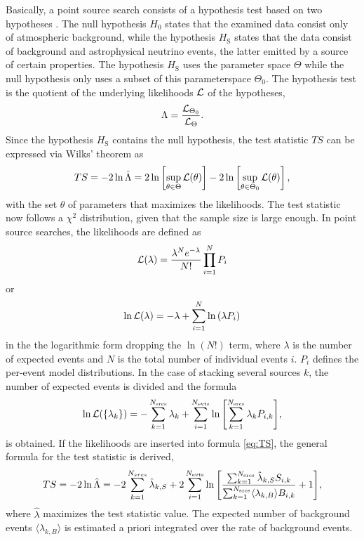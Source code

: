 Basically, a point source search consists of a hypothesis test based on two hypotheses \cite{likelihood_method}.
The null hypothesis $H_0$ states that the examined data consist only of atmospheric background, while the hypothesis $H_\text{S}$ states that the data consist of background and astrophysical neutrino events, the latter emitted by a source of certain properties.
The hypothesis $H_\text{S}$ uses the parameter space $\Theta$ while the null hypothesis only uses a subset of this parameterspace $\Theta_0$.
The hypothesis test is the quotient of the underlying likelihoods $\mathcal{L}$ of the hypotheses,
\begin{equation}
  \Lambda = \frac{\mathcal{L}_{\Theta_0}}{\mathcal{L}_\Theta}.
\end{equation}
Since the hypothesis $H_\text{S}$ contains the null hypothesis, the test statistic $TS$ can be expressed via Wilks' theorem \cite{wilk} as
\begin{equation}
  TS = -2\ln\hat{\Lambda} = 2\ln\left[ \sup_{\theta\in\Theta}\mathcal{L}(\theta) \right] - 2\ln\left[ \sup_{\theta\in\Theta_0}\mathcal{L}(\theta) \right], \label{eq:TS}
\end{equation}
with the set $\theta$ of parameters that maximizes the likelihoods.
The test statistic now follows a $\chi^2$ distribution, given that the sample size is large enough.
In point source searches, the likelihoods are defined as
\begin{equation}
  \mathcal{L}(\lambda) = \frac{\lambda^Ne^{-\lambda}}{N!}\prod^N_{i=1}P_i
\end{equation}
or
\begin{equation}
  \ln\mathcal{L}(\lambda) = -\lambda + \sum^N_{i=1}\ln{(\lambda P_i)}
\end{equation}
in the the logarithmic form \cite{ex_likelihood} dropping the $\ln(N!)$ term, where $\lambda$ is the number of expected events and $N$ is the total number of individual events $i$.
$P_i$ defines the per-event model distributions.
In the case of stacking several sources $k$, the number of expected events is divided and the formula
\begin{equation}
  \ln\mathcal{L}(\{\lambda_k\}) = -\sum^{N_\text{srcs}}_{k=1}\lambda_k + \sum^{N_\text{evts}}_{i=1}\ln{\left[ \sum^{N_\text{srcs}}_{k=1}\lambda_k P_{i,k} \right]},
\end{equation}
is obtained.
If the likelihoods are inserted into formula \eqref{eq:TS}, the general formula for the test statistic is derived,
\begin{equation}
    TS = -2\ln{\hat\Lambda} = -2\sum_{k=1}^{N_{srcs}}\hat\lambda_{k,S} + 2\sum_{i=1}^{N_{\text{evts}}}\ln{\left[ \frac{\sum_{k=1}^{N_{\text{srcs}}}\hat\lambda_{k,S}S_{i,k}}{\sum_{k=1}^{N_{\text{srcs}}}\langle\lambda_{k,B}\rangle B_{i,k}}+1 \right]}, \label{eq:TS_general}
\end{equation}
where $\hat\lambda$ maximizes the test statistic value.
The expected number of background events $\langle\lambda_{k,B}\rangle$ is estimated a priori integrated over the rate of background events.

